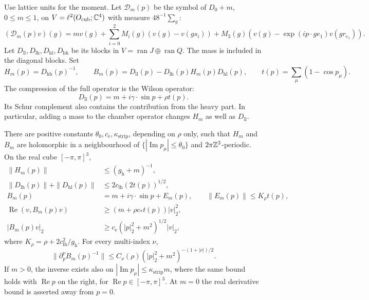 Use lattice units for the moment. Let $\mathcal D_m(p)$ be the symbol
of $D_0+m$, $0\le m\le1$, on
$V=\ell^2(O_{\mathrm{cub}};\mathbb C^4)$ with measure $48^{-1}\sum_g$:
\[
 (\mathcal D_m(p)v)(g)=m v(g)
 +\sum_{i=0}^2M_i(g)(v(g)-v(gs_i))
 +M_3(g)(v(g)-\exp(ip\cdot ge_1)v(gr_{e_1})).
\]
Let $D_{\mathrm{ll}},D_{\mathrm{lh}},D_{\mathrm{hl}},D_{\mathrm{hh}}$
be its blocks in $V=\operatorname{ran}J\oplus\operatorname{ran}Q$.
The mass is included in the diagonal blocks. Set
\[
 H_m(p)=D_{\mathrm{hh}}(p)^{-1},\qquad
 B_m(p)=D_{\mathrm{ll}}(p)-D_{\mathrm{lh}}(p)H_m(p)D_{\mathrm{hl}}(p),
 \qquad t(p)=\sum_\mu(1-\cos p_\mu).
\]
The compression of the full operator is the Wilson operator:
\[
 D_{\mathrm{ll}}(p)=m+i\gamma\cdot\sin p+\rho t(p).
\]
Its Schur complement also contains the contribution from the heavy
part. In particular, adding a mass to the chamber operator changes
$H_m$ as well as $D_{\mathrm{ll}}$.

\begin{proposition}\label{prop:schur-symbol}
There are positive constants $\theta_0,c_{\mathrm e},\kappa_{\mathrm{strip}}$, depending
on $\rho$ only, such that $H_m$ and $B_m$ are holomorphic in a
neighbourhood of $\{|\operatorname{Im}p_\mu|\le\theta_0\}$ and
$2\pi\mathbb Z^3$-periodic. On the real cube $[-\pi,\pi]^3$,
\begin{align}
 \|H_m(p)\|&\le(g_{\mathrm h}+m)^{-1},\label{eq:symbol-heavy}\\
 \|D_{\mathrm{lh}}(p)\|+\|D_{\mathrm{hl}}(p)\|
   &\le2c_{\mathrm{lh}}(2t(p))^{1/2},\label{eq:symbol-cross}\\
 B_m(p)&=m+i\gamma\cdot\sin p+E_m(p),\qquad
 \|E_m(p)\|\le K_\rho t(p),\label{eq:schur-expansion}\\
 \operatorname{Re}(v,B_m(p)v)&\ge(m+\rho c_*t(p))|v|_2^2,
                 \label{eq:schur-realpart}\\
 |B_m(p)v|_2&\ge c_{\mathrm e}(|p|_2^2+m^2)^{1/2}|v|_2,
                 \label{eq:schur-ellipticity}
\end{align}
where $K_\rho=\rho+2c_{\mathrm{lh}}^2/g_{\mathrm h}$. For every
multi-index $\nu$,
\begin{equation}\label{eq:schur-inverse-derivatives}
 \|\partial_p^\nu B_m(p)^{-1}\|
       \le C_\nu(\rho)(|p|_2^2+m^2)^{-(1+|\nu|)/2}.
\end{equation}
If $m>0$, the inverse exists also on
$|\operatorname{Im}p_\mu|\le\kappa_{\mathrm{strip}}m$, where the same bound holds
with $\operatorname{Re}p$ on the right, for
$\operatorname{Re}p\in[-\pi,\pi]^3$. At $m=0$ the real derivative
bound is asserted away from $p=0$.
\end{proposition}


